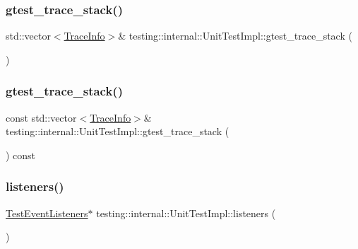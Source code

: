 \subsubsection{\texorpdfstring{gtest\+\_\+trace\+\_\+stack()}{gtest\_trace\_stack()}\hspace{0.1cm}{\footnotesize\ttfamily [1/2]}}
{\footnotesize\ttfamily std\+::vector$<$\hyperlink{structtesting_1_1internal_1_1_trace_info}{Trace\+Info}$>$\& testing\+::internal\+::\+Unit\+Test\+Impl\+::gtest\+\_\+trace\+\_\+stack (\begin{DoxyParamCaption}{ }\end{DoxyParamCaption})\hspace{0.3cm}{\ttfamily [inline]}}

\mbox{\label{classtesting_1_1internal_1_1_unit_test_impl_ad82fed50f13f13f11867af9dad4a2cf6}} 
\subsubsection{\texorpdfstring{gtest\+\_\+trace\+\_\+stack()}{gtest\_trace\_stack()}\hspace{0.1cm}{\footnotesize\ttfamily [2/2]}}
{\footnotesize\ttfamily const std\+::vector$<$\hyperlink{structtesting_1_1internal_1_1_trace_info}{Trace\+Info}$>$\& testing\+::internal\+::\+Unit\+Test\+Impl\+::gtest\+\_\+trace\+\_\+stack (\begin{DoxyParamCaption}{ }\end{DoxyParamCaption}) const\hspace{0.3cm}{\ttfamily [inline]}}

\mbox{\label{classtesting_1_1internal_1_1_unit_test_impl_a67211f8475936f88d0e4d30f841c0da4}} 
\subsubsection{\texorpdfstring{listeners()}{listeners()}}
{\footnotesize\ttfamily \hyperlink{classtesting_1_1_test_event_listeners}{Test\+Event\+Listeners}$\ast$ testing\+::internal\+::\+Unit\+Test\+Impl\+::listeners (\begin{DoxyParamCaption}{ }\end{DoxyParamCaption})\hspace{0.3cm}{\ttfamily [inline]}}

